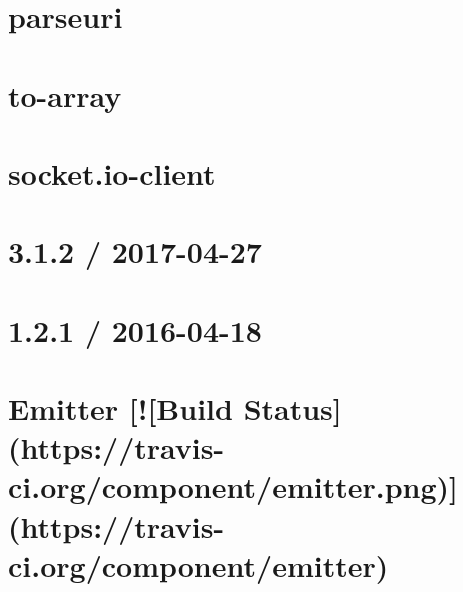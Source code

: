 \documentclass[twoside]{book}
\newcommand{\+}{\discretionary{\mbox{\scriptsize$\hookleftarrow$}}{}{}}
\begin{document}
\chapter{parseuri}
\label{md_bin_node_modules_socket_8io_node_modules_socket_8io-client_node_modules_parseuri__r_e_a_d_m_e}

\chapter{to-\/array}
\label{md_bin_node_modules_socket_8io_node_modules_socket_8io-client_node_modules_to-array__r_e_a_d_m_e}

\chapter{socket.\+io-\/client}
\label{md_bin_node_modules_socket_8io_node_modules_socket_8io-client__r_e_a_d_m_e}

\chapter{3.1.2 / 2017-\/04-\/27}
\label{md_bin_node_modules_socket_8io_node_modules_socket_8io-parser__history}

\chapter{1.2.1 / 2016-\/04-\/18}
\label{md_bin_node_modules_socket_8io_node_modules_socket_8io-parser_node_modules_component-emitter__history}

\chapter{Emitter \mbox{[}!\mbox{[}Build Status\mbox{]}(https\+://travis-\/ci.org/component/emitter.png)\mbox{]}(https\+://travis-\/ci.org/component/emitter)}
\label{md_bin_node_modules_socket_8io_node_modules_socket_8io-parser_node_modules_component-emitter__readme}

\end{document}
